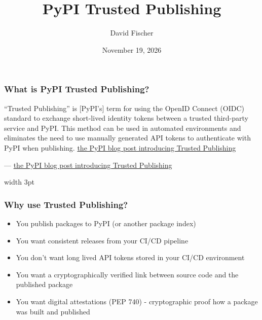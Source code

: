 \documentclass[aspectratio=169]{beamer}
\title{PyPI Trusted Publishing}
\author{David Fischer}
\date{November 19, 2026}
\newcommand{\blockquoteauthor}{}
\newenvironment{blockquote}[1][]{%
  \renewcommand{\blockquoteauthor}{#1}%
  \begin{lrbox}{\blockquotebox}%
  \begin{minipage}{0.84\textwidth}%
    \vspace*{0.8em}%
    \raggedright\itshape\linespread{1.25}\selectfont
}{%
    \ifx\blockquoteauthor\empty\else
      \par\vspace{0.9em}%
      {\raggedleft\normalfont\small\color{black!65}--- \blockquoteauthor\par}%
    \fi
    \vspace{0.8em}%
  \end{minipage}%
  \end{lrbox}%
  \begin{center}%
    \setlength{\fboxsep}{0pt}%
    \colorbox{black!4}{%
      {\color{black!45}\vrule width 3pt}%
      \hspace{1.4em}%
      \usebox{\blockquotebox}%
      \hspace{1.4em}%
    }%
  \end{center}%
}
\begin{document}
\maketitle


\begin{frame}
\frametitle{What is PyPI Trusted Publishing?}
  \begin{blockquote}[\href{https://blog.pypi.org/posts/2023-04-20-introducing-trusted-publishers/}{the PyPI blog post introducing Trusted Publishing}]
    ``Trusted Publishing'' is [PyPI's] term for using the OpenID Connect (OIDC) standard to exchange short-lived identity tokens between a trusted third-party service and PyPI. This method can be used in automated environments and eliminates the need to use manually generated API tokens to authenticate with PyPI when publishing.
  \end{blockquote}
\end{frame}


\begin{frame}
\frametitle{Why use Trusted Publishing?}

\begin{itemize}
  \item {\scriptsize You publish packages to PyPI (or another package index)}
  \item {\scriptsize You want consistent releases from your CI/CD pipeline}
  \item {\scriptsize You don't want long lived API tokens stored in your CI/CD environment}
  \item {\scriptsize You want a cryptographically verified link between source code and the published package}
  \item {\scriptsize You want digital attestations (PEP 740) - cryptographic proof how a package was built and published}
\end{itemize}

\end{frame}
\end{document}
